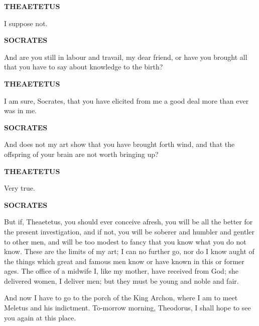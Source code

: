 \documentclass[11pt,letter]{article}
\begin{document}
\par \textbf{THEAETETUS}
\par   I suppose not.

\par \textbf{SOCRATES}
\par   And are you still in labour and travail, my dear friend, or have you brought all that you have to say about knowledge to the birth?

\par \textbf{THEAETETUS}
\par   I am sure, Socrates, that you have elicited from me a good deal more than ever was in me.

\par \textbf{SOCRATES}
\par   And does not my art show that you have brought forth wind, and that the offspring of your brain are not worth bringing up?

\par \textbf{THEAETETUS}
\par   Very true.

\par \textbf{SOCRATES}
\par   But if, Theaetetus, you should ever conceive afresh, you will be all the better for the present investigation, and if not, you will be soberer and humbler and gentler to other men, and will be too modest to fancy that you know what you do not know. These are the limits of my art; I can no further go, nor do I know aught of the things which great and famous men know or have known in this or former ages. The office of a midwife I, like my mother, have received from God; she delivered women, I deliver men; but they must be young and noble and fair.

\par  And now I have to go to the porch of the King Archon, where I am to meet Meletus and his indictment. To-morrow morning, Theodorus, I shall hope to see you again at this place.

\par 
 
\end{document}

